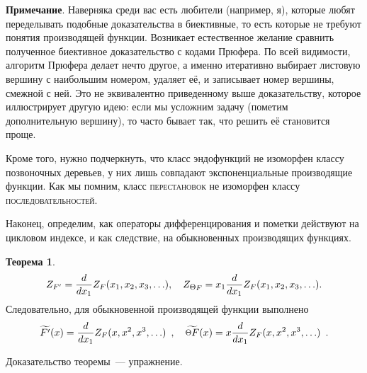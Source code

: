 \documentclass[a5paper]{article}
\def \point {\raisebox{.1\height}{\scalebox{0.8}{$\Theta$}}}
\theoremstyle{definition}
\newtheorem*{theorem}{Теорема}
\begin{document}
{\footnotesize
\textbf{Примечание}. Наверняка среди вас есть любители (например, я), которые
любят переделывать подобные доказательства в биективные, то есть которые не
требуют понятия производящей функции. Возникает естественное желание сравнить
полученное биективное доказательство с кодами Прюфера. По всей видимости,
алгоритм Прюфера делает нечто другое, а именно итеративно выбирает листовую вершину с
наибольшим номером, удаляет её, и записывает номер вершины, смежной с ней. Это
не эквивалентно приведенному выше доказательству, которое иллюстрирует другую
идею: если мы усложним задачу (пометим дополнительную вершину), то часто бывает
так, что решить её становится проще.

Кроме того, нужно подчеркнуть, что класс эндофункций не изоморфен классу
позвоночных деревьев, у них лишь совпадают экспоненциальные производящие
функции. Как мы помним, класс
\textsc{перестановок} не изоморфен классу \textsc{последовательностей}.}

Наконец, определим, как операторы дифференцирования и пометки действуют на
цикловом индексе, и как следствие, на обыкновенных производящих функциях.
\begin{theorem}
\[
    Z_{F'} = \dfrac{d}{dx_1} Z_F(x_1, x_2, x_3, \ldots), \quad
    Z_{\point F} = x_1 \dfrac{d}{d x_1} Z_F(x_1, x_2, x_3, \ldots). 
\]
Следовательно, для обыкновенной производящей функции выполнено
\[
    \widetilde{F'}(x) = \dfrac{d}{dx_1} Z_F(x, x^2, x^3, \ldots)\enspace ,
\quad
    \widetilde{\point F}(x) = x \dfrac{d}{dx_1} Z_F(x, x^2, x^3, \ldots)
\enspace .
\]
\end{theorem}
Доказательство теоремы~--- упражнение.
\end{document}
